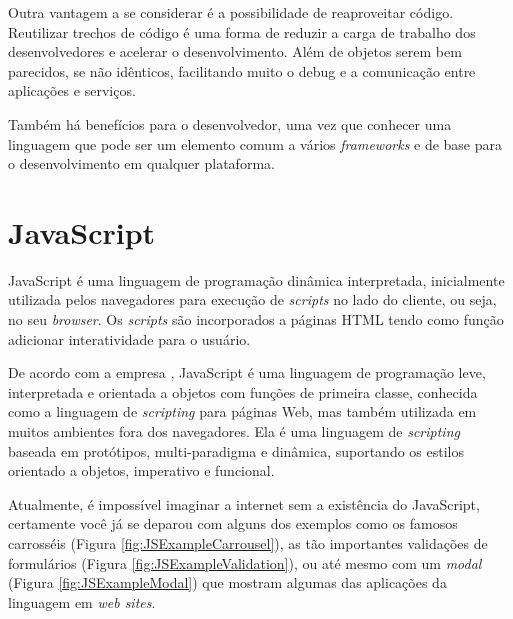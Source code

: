 \documentclass[
	12pt,				%
	openright,			%
	twoside,			%
	a4paper,			%
	english,			%
	brazil				%
	]{abntex2}
\begin{document}
Outra vantagem a se considerar é a possibilidade de reaproveitar código. Reutilizar trechos de código é uma forma de reduzir a carga de trabalho dos desenvolvedores e acelerar o desenvolvimento. Além de objetos serem bem parecidos, se não idênticos, facilitando muito o debug e a comunicação entre aplicações e serviços.

Também há benefícios para o desenvolvedor, uma vez que conhecer uma linguagem que pode ser um elemento comum a vários \textit{frameworks} e de base para o desenvolvimento em qualquer plataforma.

\section{JavaScript}


JavaScript é uma linguagem de programação dinâmica interpretada, inicialmente utilizada pelos navegadores para execução de \textit{scripts} no lado do cliente, ou seja, no seu \textit{browser}. Os \textit{scripts} são incorporados a páginas HTML tendo como função adicionar interatividade para o usuário.

De acordo com a empresa \citeauthor{mdn_javascript}, JavaScript é uma linguagem de programação leve, interpretada e orientada a objetos com funções de primeira classe, conhecida como a linguagem de \textit{scripting} para páginas Web, mas também utilizada em muitos ambientes fora dos navegadores. Ela é uma linguagem de \textit{scripting} baseada em protótipos, multi-paradigma e dinâmica, suportando os estilos orientado a objetos, imperativo e funcional.

Atualmente, é impossível imaginar a internet sem a existência do JavaScript, certamente você já se deparou com alguns dos exemplos como os famosos carrosséis (Figura \ref{fig:JSExampleCarrousel}), as tão importantes validações de formulários (Figura \ref{fig:JSExampleValidation}), ou até mesmo com um \textit{modal} (Figura \ref{fig:JSExampleModal}) que mostram algumas das aplicações da linguagem em \textit{web sites}.
\end{document}
